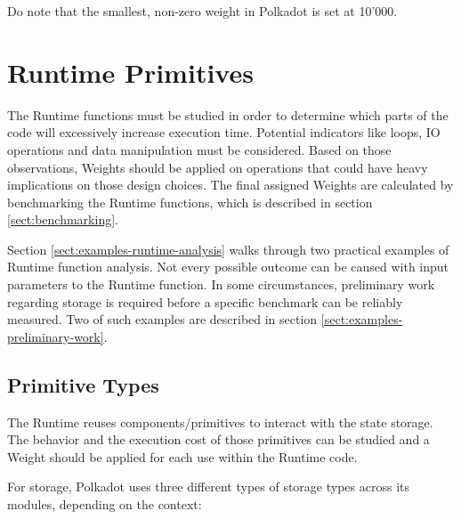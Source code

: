 \documentclass[11pt,a4paper]{article}
\begin{document}
Do note that the smallest, non-zero weight in Polkadot is set at 10'000.

\section{Runtime Primitives}
The Runtime functions must be studied in order to determine which parts of the code will excessively
increase execution time. Potential indicators like loops, IO operations and data manipulation must
be considered. Based on those observations, Weights should be applied on operations
that could have heavy implications on those design choices. The final assigned Weights are calculated
by benchmarking the Runtime functions, which is described in section \ref{sect:benchmarking}.
\newline

Section \ref{sect:examples-runtime-analysis} walks through two practical examples of Runtime function
analysis.
Not every possible outcome can be caused with input parameters to the Runtime function.
In some circumstances, preliminary work regarding
storage is required before a specific benchmark can be reliably measured.
Two of such examples are described in section \ref{sect:examples-preliminary-work}.

\subsection{Primitive Types}\label{sect:primitive-types}
The Runtime reuses components/primitives to interact with the state storage. The behavior and
the execution cost of those primitives can be studied and a Weight should be applied for each use
within the Runtime code.
\newline

For storage, Polkadot uses three different types of storage types across its modules, depending on the
context:
\end{document}
